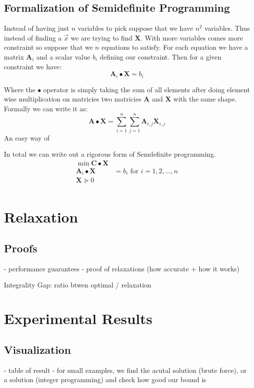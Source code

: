 \documentclass{article}
\begin{document}
\subsection{Formalization of Semidefinite Programming}
Instead of having just \( n \) variables to pick suppose that we have \( n^2 \) variables. Thus instead of finding a \( \vec{x} \) we are trying to find \( \mathbf{X} \). With more variables comes more constraint so suppose that we \( n \) equations to satisfy. For each equation we have a matrix \( \mathbf{A}_i \) and a scalar value \( b_i \) defining our constraint. Then for a given constraint we have:
\[
\mathbf{A}_i \bullet \mathbf{X} = b_i
\]

Where the \( \bullet \) operator is simply taking the sum of all elements after doing element wise multiplication on matricies two matricies \( \mathbf{A} \) and \( \mathbf{X} \) with the same shape. Formally we can write it as:
\[
  \mathbf{A} \bullet \mathbf{X} = \sum_{i = 1}^n \sum_{j = 1}^n \mathbf{A}_{i, j} \mathbf{X}_{i, j}
\]
An easy way of

In total we  can write out a rigorous form of Semdefinite programming.
\begin{align*}
  \min \mathbf{C} \bullet \mathbf{X} \\
  \mathbf{A}_i \bullet \mathbf{X} &= b_i  \text{   for } i = 1, 2, ..., n\\
  \mathbf{X} \succeq 0 \\
\end{align*}


\section{Relaxation}   %
\subsection{Proofs}
- performance guarantees
- proof of relaxations (how accurate + how it works)


Integrality Gap: ratio btwen optimal / relaxation 



\section{Experimental Results}
\subsection{Visualization}
- table of result
- for small examples, we find the acutal solution (brute force), or a solution (integer programming) and check how 
good our bound is
\end{document}
